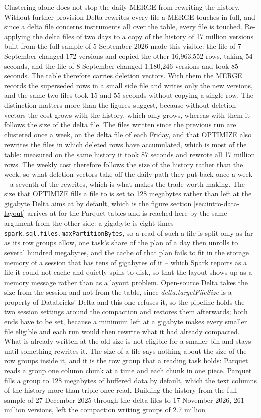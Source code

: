 Clustering alone does not stop the daily MERGE from rewriting the history. Without further provision Delta rewrites every file a MERGE touches in full, and since a delta file concerns instruments all over the table, every file is touched. Re-applying the delta files of two days to a copy of the history of 17 million versions built from the full sample of 5 September 2026 made this visible: the file of 7 September changed 172 versions and copied the other 16,963,552 rows, taking 54 seconds, and the file of 8 September changed 1,180,246 versions and took 85 seconds. The table therefore carries deletion vectors. With them the MERGE records the superseded rows in a small side file and writes only the new versions, and the same two files took 15 and 55 seconds without copying a single row. The distinction matters more than the figures suggest, because without deletion vectors the cost grows with the history, which only grows, whereas with them it follows the size of the delta file. The files written since the previous run are clustered once a week, on the delta file of each Friday, and that OPTIMIZE also rewrites the files in which deleted rows have accumulated, which is most of the table: measured on the same history it took 87 seconds and rewrote all 17 million rows. The weekly cost therefore follows the size of the history rather than the week, so what deletion vectors take off the daily path they put back once a week -- a seventh of the rewrites, which is what makes the trade worth making. The size that OPTIMIZE fills a file to is set to 128 megabytes rather than left at the gigabyte Delta aims at by default, which is the figure section \ref{sec:intro-data-layout} arrives at for the Parquet tables and is reached here by the same argument from the other side: a gigabyte is eight times \verb|spark.sql.files.maxPartitionBytes|, so a read of such a file is split only as far as its row groups allow, one task's share of the plan of a day then unrolls to several hundred megabytes, and the cache of that plan fails to fit in the storage memory of a session that has tens of gigabytes of it -- which Spark reports as a file it could not cache and quietly spills to disk, so that the layout shows up as a memory message rather than as a layout problem. Open-source Delta takes the size from the session and not from the table, since \emph{delta.targetFileSize} is a property of Databricks' Delta and this one refuses it, so the pipeline holds the two session settings around the compaction and restores them afterwards; both ends have to be set, because a minimum left at a gigabyte makes every smaller file eligible and each run would then rewrite what it had already compacted. What is already written at the old size is not eligible for a smaller bin and stays until something rewrites it. The size of a file says nothing about the size of the row groups inside it, and it is the row group that a reading task holds: Parquet reads a group one column chunk at a time and each chunk in one piece. Parquet fills a group to 128 megabytes of buffered data by default, which the text columns of the history more than triple once read. Building the history from the full sample of 27 December 2025 through the delta files to 17 November 2026, 261 million versions, left the compaction writing groups of 2.7 million 